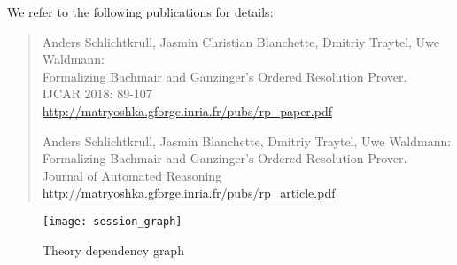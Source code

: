 \documentclass[10pt,a4paper]{article}
\begin{document}
\medskip

We refer to the following publications for details:

\begin{quote}
Anders Schlichtkrull, Jasmin Christian Blanchette, Dmitriy Traytel, Uwe Waldmann: \\
Formalizing Bachmair and Ganzinger's Ordered Resolution Prover. \\
IJCAR 2018: 89-107 \\
\url{http://matryoshka.gforge.inria.fr/pubs/rp_paper.pdf}

\medskip

Anders Schlichtkrull, Jasmin Blanchette, Dmitriy Traytel, Uwe Waldmann: \\
Formalizing Bachmair and Ganzinger's Ordered Resolution Prover. \\
Journal of Automated Reasoning \\
\url{http://matryoshka.gforge.inria.fr/pubs/rp_article.pdf}
\end{quote}

\begin{figure}
\begin{center}
  \texttt{[image: session\_graph]}
\end{center}
\caption{Theory dependency graph}
\label{fig:thys}
\end{figure}



% 
% 
\end{document}
